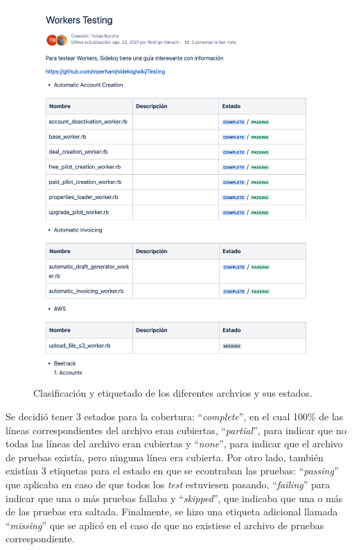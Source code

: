   \begin{figure}
    \centering
    \includegraphics[width=0.75\linewidth]{figures/testing/mapeo_tests_existentes.png}
    \caption{Clasificación y etiquetado de los diferentes archvios y sus estados.}
    \label{fig:mapeo_tests}
  \end{figure}

  Se decidió tener 3 estados para la cobertura: ``\textit{complete}'', en el cual 100\% de las líneas correspondientes del archivo eran cubiertas, ``\textit{partial}'', para indicar que no todas las líneas del archivo eran cubiertas y ``\textit{none}'', para indicar que el archivo de pruebas existía, pero ninguna línea era cubierta. Por otro lado, también existían 3 etiquetas para el estado en que se econtraban las pruebas: ``\textit{passing}'' que aplicaba en caso de que todos los \textit{test} estuviesen pasando, ``\textit{failing}'' para indicar que una o más pruebas fallaba y ``\textit{skipped}'', que indicaba que una o más de las pruebas era saltada. Finalmente, se hizo una etiqueta adicional llamada ``\textit{missing}'' que se aplicó en el caso de que no existiese el archivo de pruebas correspondiente.
  
